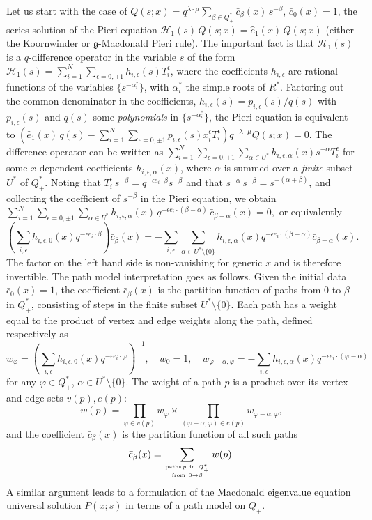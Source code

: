 \documentclass[12pt]{amsart}
\newcommand{\g}{{\mathfrak{g}}}
\newcommand{\cH}{{\mathcal{H}}}
\newcommand{\al}{{\alpha}}
\numberwithin{equation}{section}
\begin{document}
Let us start with the case of $Q(s;x)=q^{\lambda\cdot\mu}\sum_{\beta\in Q_+^*} {\bar c}_\beta(x) \, s^{-\beta}$, $\bar c_0(x)=1$, the series solution of 
the Pieri equation $\cH_1(s) \, Q(s;x)=\hat e_1(x)\, Q(s;x)$ (either the Koornwinder or $\g$-Macdonald Pieri rule). 
The important fact is that $\cH_1(s)$ is a $q$-difference operator in the variable $s$
of the form $\cH_1(s)=\sum_{i=1}^N\sum_{\epsilon=0,\pm 1} h_{i,\epsilon}(s) T_i^\epsilon$, where the coefficients $h_{i,\epsilon}$ are  rational functions
of the variables $\{s^{-\al_i^*}\}$, with $\al_i^*$ the simple roots of $R^*$.
Factoring out the common denominator in the coefficients, $h_{i,\epsilon}(s)= p_{i,\epsilon}(s)/q(s)$ with $p_{i,\epsilon}(s)$ and $q(s)$ 
some {\it polynomials} in $\{s^{-\al_i^*}\}$, the Pieri equation is equivalent to
$\left(\hat e_1(x)\, q(s)-\sum_{i=1}^N\sum_{\epsilon=0,\pm 1} p_{i,\epsilon}(s) x_i^\epsilon T_i^\epsilon \right){q^{-\lambda\cdot\mu}Q(s;x)}=0.$
%
The difference operator can be written as
$\sum_{i=1}^N\sum_{\epsilon=0,\pm 1} \sum_{\al\in U^*} h_{i,\epsilon,\al}(x) s^{-\al} T_i^\epsilon$ 
for some $x$-dependent coefficients $h_{i,\epsilon,\al}(x)$, where $\al$ is summed over a {\it finite} subset $U^*$ of $Q_+^*$.
Noting that $T_i^\epsilon\, s^{-\beta}=q^{-\epsilon e_i\cdot\beta}s^{-\beta}$ and that $s^{-\al}\, s^{-\beta}=s^{-(\al+\beta)}$,
and collecting the coefficient of $s^{-\beta}$ in the Pieri equation, we obtain
$\sum_{i=1}^N\sum_{\epsilon=0,\pm 1} \sum_{\al\in U^*} h_{i,\epsilon,\al}(x)\, q^{-\epsilon e_i\cdot(\beta-\al)}\,{\bar c}_{\beta-\al}(x)=0,$
or equivalently
$$\left(\sum_{i,\epsilon} h_{i,\epsilon,0}(x) q^{-\epsilon e_i\cdot\beta} \right){\bar c}_{\beta}(x)=-
\sum_{i,\epsilon}\sum_{\al\in U^*\setminus \{0\}} h_{i,\epsilon,\al}(x) q^{-\epsilon e_i\cdot(\beta-\al)} {\bar c}_{\beta-\al}(x).$$
The factor on the left hand side is non-vanishing for generic $x$ and is therefore invertible.
The path model interpretation goes as follows. Given the initial data $\bar c_0(x)=1$, the coefficient ${\bar c}_{\beta}(x)$ 
is the partition function of paths from $0$ to $\beta$ in $Q^*_+$, consisting of steps
in the finite subset $U^*\setminus \{0\}$. Each path has a weight equal to the product of vertex and edge weights along the path, 
defined respectively as
$$ w_\varphi= \left(\sum_{i,\epsilon} h_{i,\epsilon,0}(x) q^{-\epsilon e_i\cdot\varphi} \right)^{-1},\quad  w_0=1,\quad
w_{\varphi-\al,\varphi}= -\sum_{i,\epsilon}h_{i,\epsilon,\al}(x) q^{-\epsilon e_i\cdot(\varphi-\al)}$$
for any $\varphi\in Q_+^*$, $\al \in U^*\setminus \{0\}$. The weight of a path $p$ is a product over its vertex and edge sets $v(p),e(p)$:
$$w(p)= \prod_{ \varphi\in  v(p)} w_\varphi  \times \prod_{(\varphi-\al,\varphi)\in e(p)} w_{\varphi-\al,\varphi} ,
$$
and the coefficient $\bar c_\beta(x)$ is the partition function of all such paths
$$ {\bar c}_{\beta}(x)=\sum_{{\rm paths}\, p\ {\rm in}\ Q_+^*\atop {\rm from}\ 0\to\beta} w(p) .$$
%
%
%
%
A similar argument leads to a formulation of the Macdonald eigenvalue equation universal solution $P(x;s)$ in terms of a path model on $Q_+$.
\end{document}
